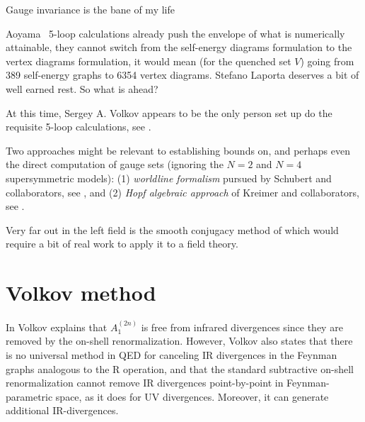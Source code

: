 \begin{bartlett}{
{Gauge invariance is the bane of my life}
        }
\end{bartlett}
\bigskip

\noindent
Aoyama \etal\ 5-loop calculations already push the envelope of what is
numerically attainable, they cannot switch from the self-energy
diagrams formulation to the vertex diagrams formulation, it would mean
(for the quenched set $V$) going from 389 self-energy graphs to 6354
vertex diagrams. Stefano Laporta deserves a bit of well earned rest. So
what is ahead?

At this time, Sergey  A. Volkov appears to be the
only person set up do the requisite 5-loop calculations,
see .

Two approaches might be relevant to
establishing bounds on, and perhaps even the direct computation
of gauge sets (ignoring the $N\!=\!2$ and $N\!=\!4$
supersymmetric models):
(1)
\emph{worldline formalism} pursued by
{Schubert} and collaborators,
see ,
and
(2)
\emph{Hopf algebraic approach} of Kreimer and collaborators,
see .

Very far out in the left field is the smooth conjugacy method of
 which would require a bit of real work to apply it
to a field theory.



\section{Volkov method}
\label{sect:Volkov}

In  Volkov explains that $A_1^{(2n)}$ is free from
infrared divergences since they are removed by the on-shell
renormalization.
However, Volkov also states that there is no universal method in QED for
canceling IR divergences in the Feynman graphs analogous to the R
operation, and that the standard subtractive on-shell renormalization
cannot remove IR divergences point-by-point in Feynman-parametric space,
as it does for UV divergences. Moreover, it can generate additional
IR-divergences.

